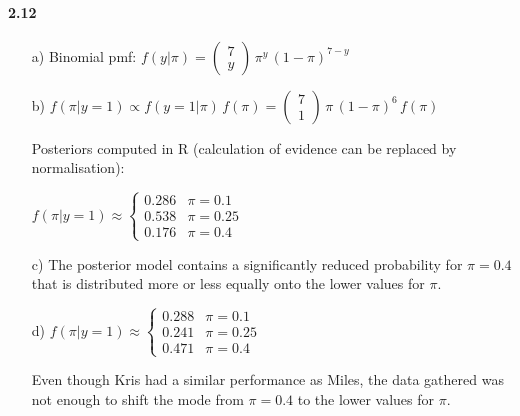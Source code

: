 \documentclass[fontsize=11pt,DIV=18,parskip=half]{scrartcl}
\begin{document}
\paragraph{2.12}
\begin{enumerate}
\item[a)] Binomial pmf: $f(y|\pi) = \begin{pmatrix} 7 \\ y \end{pmatrix} \, \pi^y \, (1-\pi)^{7-y}$
\item[b)] $f(\pi|y=1) \propto f(y=1|\pi)\, f(\pi) = \begin{pmatrix} 7 \\ 1 \end{pmatrix} \, \pi \, (1-\pi)^{6} \, f(\pi)$

Posteriors computed in R (calculation of evidence can be replaced by normalisation):

$f(\pi|y=1) \approx \left\{ \begin{array}{ll}0.286 & \pi=0.1\\0.538 & \pi=0.25\\ 0.176 & \pi=0.4\end{array}\right.$ 

\item[c)] The posterior model contains a significantly reduced probability for $\pi=0.4$ that is distributed more or less equally onto the lower values for $\pi$.

\item[d)] $f(\pi|y=1) \approx \left\{ \begin{array}{ll}0.288 & \pi=0.1\\0.241 & \pi=0.25\\ 0.471 & \pi=0.4\end{array}\right.$

Even though Kris had a similar performance as Miles, the data gathered was not enough to shift the mode from $\pi=0.4$ to the lower values for $\pi$.
\end{enumerate}
\end{document}
